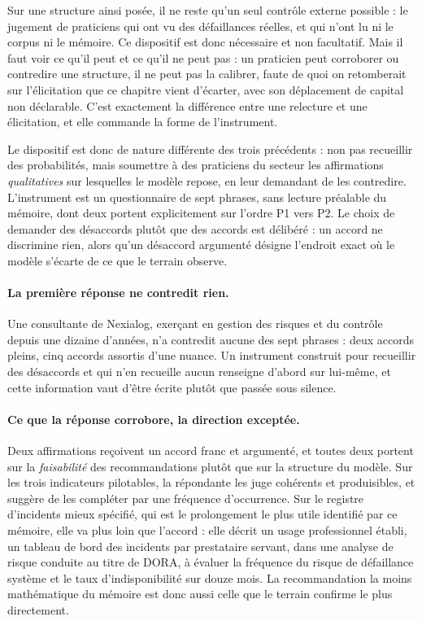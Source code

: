 Sur une structure ainsi posée, il ne reste qu'un seul contrôle externe possible : le
jugement de praticiens qui ont vu des défaillances réelles, et qui n'ont lu ni le corpus ni le
mémoire. Ce dispositif est donc nécessaire et non facultatif. Mais il faut voir ce
qu'il peut et ce qu'il ne peut pas : un praticien peut corroborer ou contredire une
structure, il ne peut pas la calibrer, faute de quoi on retomberait sur l'élicitation
que ce chapitre vient d'écarter, avec son déplacement de capital non déclarable. C'est
exactement la différence entre une relecture et une élicitation, et elle commande la forme de
l'instrument.

Le dispositif est donc de nature différente des trois précédents : non pas recueillir des
probabilités, mais soumettre à des praticiens du secteur les affirmations \emph{qualitatives}
sur lesquelles le modèle repose, en leur demandant de les contredire. L'instrument est
un questionnaire de sept phrases, sans lecture préalable du mémoire, dont deux portent
explicitement sur l'ordre P1 vers P2. Le choix de demander des désaccords plutôt que des
accords est délibéré : un accord ne discrimine rien, alors qu'un désaccord argumenté désigne
l'endroit exact où le modèle s'écarte de ce que le terrain observe.

\paragraph{La première réponse ne contredit rien.} Une consultante de Nexialog, exerçant en
gestion des risques et du contrôle depuis une dizaine d'années, n'a contredit aucune
des sept phrases : deux accords pleins, cinq accords assortis d'une nuance. Un instrument
construit pour recueillir des désaccords et qui n'en recueille aucun renseigne d'abord sur
lui-même, et cette information vaut d'être écrite plutôt que passée sous silence.

\paragraph{Ce que la réponse corrobore, la direction exceptée.} Deux affirmations
reçoivent un accord franc et argumenté, et toutes deux portent sur la \emph{faisabilité} des
recommandations plutôt que sur la structure du modèle. Sur les trois indicateurs pilotables,
la répondante les juge cohérents et produisibles, et suggère de les compléter par une fréquence
d'occurrence. Sur le registre d'incidents mieux spécifié, qui est le prolongement le plus utile
identifié par ce mémoire, elle va plus loin que l'accord : elle décrit un usage professionnel
établi, un tableau de bord des incidents par prestataire servant, dans une analyse de risque
conduite au titre de DORA, à évaluer la fréquence du risque de défaillance système et le taux
d'indisponibilité sur douze mois. La recommandation la moins mathématique du mémoire est donc
aussi celle que le terrain confirme le plus directement.

